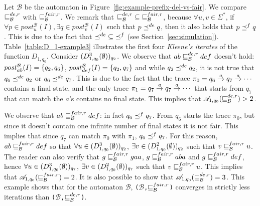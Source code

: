 \begin{example}
Let $\mathcal{B}$ be the automaton in
Figure~\ref{fig:example-prefix-del-vs-fair}.
We compare $\sqsubseteq_{\mathcal{B}}^{de,r}$ with $\sqsubseteq_{\mathcal{B}}^{fair,r}$.
We remark that $\mathord{\sqsubseteq_{\mathcal{B}}^{de,r}} \subseteq \mathord{\sqsubseteq_{\mathcal{B}}^{fair,r}}$,
because $\forall u,v \in \Sigma^*$,
if $\forall p \in post_u^{\mathcal{B}}(I), \exists q \in post_v^{\mathcal{B}}(I)$
such that $p \preceq^{de} q$, then it also holds that $p \preceq^{f} q$.
This is due to the fact that $\mathord{\preceq^{de}} \subseteq \mathord{\preceq^{f}}$
(see Section~\ref{sec:simulation}).
Table~\ref{table:D_1-example3} illustrates the first four \emph{Kleene's iterates}
of the function $D_{1,q_0}$.
Consider $(D_{1,q_0}^{3}(\emptyset))_{q_2}$.
We observe that $ab \sqsubseteq_{\mathcal{B}}^{de,r} def$ doesn't hold:
$post_{ab}^{\mathcal{B}}(I) = \{q_2, q_6\}$, $post_{def}^{\mathcal{B}}(I) = \{q_2, q_7\}$
and while $q_2 \preceq^{de} q_2$, it is not true that $q_6 \preceq^{de} q_2$ or $q_6 \preceq^{de} q_7$.
This is due to the fact that the trace $\pi_0 = q_6 \overset{a}{\rightarrow} q_7 \overset{a}{\rightarrow} \cdots$
contains a final state, and the only trace $\pi_1 = q_7 \overset{a}{\rightarrow} q_7 \overset{a}{\rightarrow} \cdots$
that starts from $q_7$ that can match the $a$'s contains no final state.
This implies that $\mathscr{A}_{1, q_0}(\sqsubseteq_{\mathcal{B}}^{de,r}) > 2$.

We observe that $ab \sqsubseteq_{\mathcal{B}}^{fair,r} def$: in fact $q_6 \preceq^{f} q_7$.
From $q_6$ starts the trace $\pi_0$, but since it doesn't contain one infinite
number of final states it is not fair.
This implies that since $q_7$ can match $\pi_0$ with $\pi_1$, $q_6 \preceq^{f} q_7$.
For this reason, $ab \sqsubseteq_{\mathcal{B}}^{fair,r} def$ so that
$\forall u \in (D_{1,q_0}^{3}(\emptyset))_{q_2}$, $\exists v \in (D_{1,q_0}^{2}(\emptyset))_{q_2}$
such that $v \sqsubseteq_{\mathcal{B}}^{fair,r} u$.
The reader can also verify that $g \sqsubseteq_{\mathcal{B}}^{fair,r} gaa$, $g \sqsubseteq_{\mathcal{B}}^{fair,r} aba$
and $g \sqsubseteq_{\mathcal{B}}^{fair,r} def$, hence
$\forall u \in (D_{1,q_0}^{3}(\emptyset))_{q_7}$, $\exists v \in (D_{1,q_0}^{2}(\emptyset))_{q_7}$
such that $v \sqsubseteq_{\mathcal{B}}^{fair,r} u$.
This implies that $\mathscr{A}_{1, q_0}(\sqsubseteq_{\mathcal{B}}^{fair,r}) = 2$.
It is also possible to show that $\mathscr{A}_{1, q_0}(\sqsubseteq_{\mathcal{B}}^{de,r}) = 3$.
This example shows that for the automaton $\mathcal{B}$,
\texttt{($\mathcal{B}$,$\sqsubseteq_{\mathcal{B}}^{fair,r}$)} converges in strictly less iterations
than \texttt{($\mathcal{B}$,$\sqsubseteq_{\mathcal{B}}^{de,r}$)}.
\end{example}

